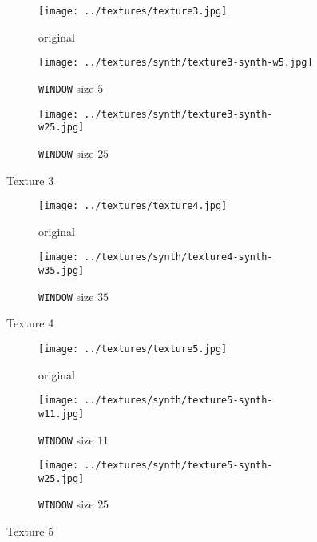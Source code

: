 \documentclass{article}
\begin{document}
\begin{figure}[H]
	\begin{subfigure}{0.33\textwidth}
		\centering
		\texttt{[image: ../textures/texture3.jpg]}
		\caption{original}
		\label{text-3-orig}
	\end{subfigure}%
	\begin{subfigure}{0.33\textwidth}
		\centering
		\texttt{[image: ../textures/synth/texture3-synth-w5.jpg]}
		\caption{\texttt{WINDOW} size $5$}
		\label{text-3-w5}
	\end{subfigure}%
	\begin{subfigure}{0.33\textwidth}
		\centering
		\texttt{[image: ../textures/synth/texture3-synth-w25.jpg]}
		\caption{\texttt{WINDOW} size $25$}
		\label{text-3-w25}
	\end{subfigure}%
	\caption{Texture 3}
	\label{text-3}
\end{figure}


\begin{figure}[H]
	\begin{subfigure}{0.5\textwidth}
		\centering
		\texttt{[image: ../textures/texture4.jpg]}
		\caption{original}
		\label{text-4-orig}
	\end{subfigure}%
	\begin{subfigure}{0.5\textwidth}
		\centering
		\texttt{[image: ../textures/synth/texture4-synth-w35.jpg]}
		\caption{\texttt{WINDOW} size $35$}
		\label{text-4-w5}
	\end{subfigure}%
	\caption{Texture 4}
	\label{text-4}
\end{figure}


\begin{figure}[H]
	\begin{subfigure}{0.33\textwidth}
		\centering
		\texttt{[image: ../textures/texture5.jpg]}
		\caption{original}
		\label{text-5-orig}
	\end{subfigure}%
	\begin{subfigure}{0.33\textwidth}
		\centering
		\texttt{[image: ../textures/synth/texture5-synth-w11.jpg]}
		\caption{\texttt{WINDOW} size $11$}
		\label{text-5-w11}
	\end{subfigure}%
	\begin{subfigure}{0.33\textwidth}
		\centering
		\texttt{[image: ../textures/synth/texture5-synth-w25.jpg]}
		\caption{\texttt{WINDOW} size $25$}
		\label{text-5-w25}
	\end{subfigure}%
	\caption{Texture 5}
	\label{text-5}
\end{figure}
\end{document}
